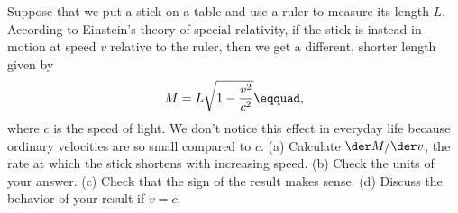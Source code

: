 Suppose that we put a stick on a table and use a ruler
to measure its length $L$.
According to Einstein's theory of special relativity,
if the stick is instead in motion at speed $v$ relative to the ruler, then
we get a different, shorter length given by
\begin{equation*}
  M = L\sqrt{1-\frac{v^2}{c^2}}\eqquad,
\end{equation*}
where $c$ is the speed of light. We don't notice this effect in
everyday life because ordinary velocities are so small compared
to $c$.
(a) Calculate $\der M/\der v$, the rate at which the stick shortens
with increasing speed. (b) Check the units of your answer.
(c) Check that the sign of the result makes sense.
(d) Discuss the behavior of your result if $v=c$.\answercheck
